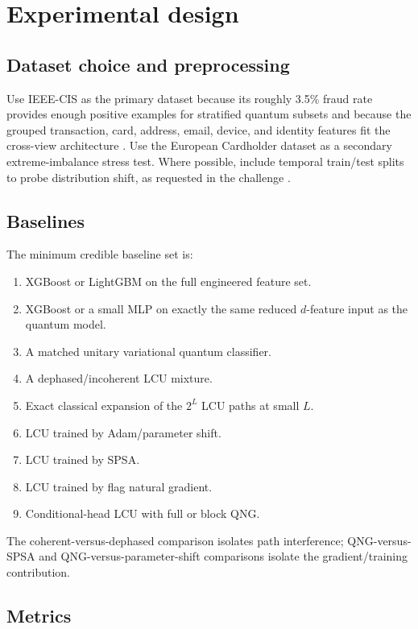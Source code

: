 \documentclass[11pt,a4paper]{article}
\begin{document}
\section{Experimental design}

\subsection{Dataset choice and preprocessing}

Use IEEE-CIS as the primary dataset because its roughly 3.5\% fraud rate provides enough positive examples for stratified quantum subsets and because the grouped transaction, card, address, email, device, and identity features fit the cross-view architecture \cite{HSBC2026}. Use the European Cardholder dataset as a secondary extreme-imbalance stress test. Where possible, include temporal train/test splits to probe distribution shift, as requested in the challenge \cite{HSBC2026}.

\subsection{Baselines}

The minimum credible baseline set is:
\begin{enumerate}[leftmargin=*]
\item XGBoost or LightGBM on the full engineered feature set.
\item XGBoost or a small MLP on exactly the same reduced $d$-feature input as the quantum model.
\item A matched unitary variational quantum classifier.
\item A dephased/incoherent LCU mixture.
\item Exact classical expansion of the $2^L$ LCU paths at small $L$.
\item LCU trained by Adam/parameter shift.
\item LCU trained by SPSA.
\item LCU trained by flag natural gradient.
\item Conditional-head LCU with full or block QNG.
\end{enumerate}
The coherent-versus-dephased comparison isolates path interference; QNG-versus-SPSA and QNG-versus-parameter-shift comparisons isolate the gradient/training contribution.

\subsection{Metrics}
\end{document}
